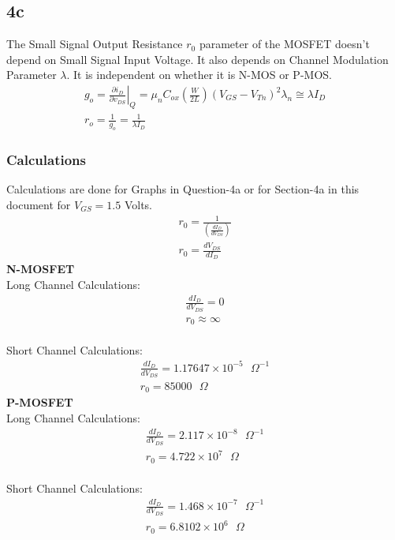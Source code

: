 \documentclass{article}
\begin{document}
\subsection{4c}
The Small Signal Output Resistance $r_{0}$ parameter of the MOSFET doesn't depend on Small Signal Input Voltage. It also depends on Channel Modulation Parameter $\lambda$. It is independent on whether it is N-MOS or P-MOS.\\
\begin{align}
    g_{o}=\left.\frac{\partial i_{D}}{\partial v_{D S}}\right|_{Q}=\mu_{n} C_{o x}\left(\frac{W}{2 L}\right)\left(V_{G S}-V_{T n}\right)^{2} \lambda_{n} \cong \lambda I_{D} \\
    r_{o}=\frac{1}{g_{o}}=\frac{1}{\lambda I_{D}}
\end{align}
\subsubsection{Calculations}
Calculations are done for Graphs in Question-4a or for Section-4a in this document for $V_{GS} = 1.5$ Volts.
\begin{align}
    r_{0} = \frac{1}{(\frac{dI_D}{dV_{DS}})}\\
    r_{0} = \frac{dV_{DS}}{dI_D}
\end{align}
\textbf{N-MOSFET}\\
Long Channel Calculations:\\
\begin{align}
    \frac{dI_{D}}{dV_{DS}} = 0\\
    r_{0} \approx \infty
\end{align}
\\
Short Channel Calculations:\\
\begin{align}
    \frac{dI_{D}}{dV_{DS}} = 1.17647 \times 10^{-5} \text{ } \Omega^{-1}\\
    r_{0} = 85000 \text{ }\Omega
\end{align}
\textbf{P-MOSFET}\\
Long Channel Calculations:\\
\begin{align}
    \frac{dI_{D}}{dV_{DS}} = 2.117\times10^{-8} \text{ }\Omega^{-1}\\
    r_{0}  = 4.722 \times 10^7 \text{ }\Omega
\end{align}
\\
Short Channel Calculations:\\
\begin{align}
    \frac{dI_{D}}{dV_{DS}} = 1.468 \times 10^{-7} \text{ }\Omega^{-1}\\
    r_{0} = 6.8102 \times 10^6 \text{ }\Omega
\end{align}
\\
\pagebreak
\end{document}
